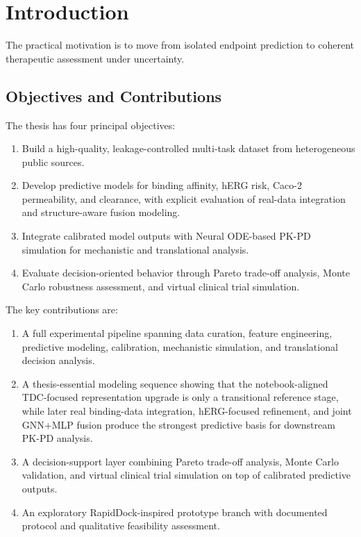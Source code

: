 \documentclass[a4paper,11pt,twoside]{report}
\begin{document}
\pagestyle{fancy}
\tableofcontents
\thispagestyle{empty}
\clearpage

\chapter{Introduction}
The practical motivation is to move from isolated endpoint prediction to coherent therapeutic assessment under uncertainty.

\section{Objectives and Contributions}

The thesis has four principal objectives:
\begin{enumerate}
\item Build a high-quality, leakage-controlled multi-task dataset from heterogeneous public sources.
\item Develop predictive models for binding affinity, hERG risk, Caco-2 permeability, and clearance, with explicit evaluation of real-data integration and structure-aware fusion modeling.
\item Integrate calibrated model outputs with Neural ODE-based PK-PD simulation for mechanistic and translational analysis.
\item Evaluate decision-oriented behavior through Pareto trade-off analysis, Monte Carlo robustness assessment, and virtual clinical trial simulation.
\end{enumerate}

The key contributions are:
\begin{enumerate}
\item A full experimental pipeline spanning data curation, feature engineering, predictive modeling, calibration, mechanistic simulation, and translational decision analysis.
\item A thesis-essential modeling sequence showing that the notebook-aligned TDC-focused representation upgrade is only a transitional reference stage, while later real binding-data integration, hERG-focused refinement, and joint GNN+MLP fusion produce the strongest predictive basis for downstream PK-PD analysis.
\item A decision-support layer combining Pareto trade-off analysis, Monte Carlo validation, and virtual clinical trial simulation on top of calibrated predictive outputs.
\item An exploratory RapidDock-inspired prototype branch with documented protocol and qualitative feasibility assessment.
\end{enumerate}
\end{document}
